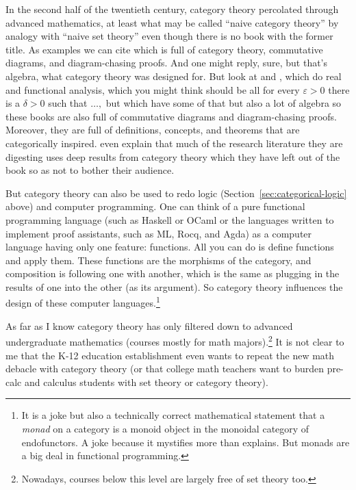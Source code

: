 \documentclass[11pt]{article}
\begin{document}
In the second half of the twentieth century, category theory percolated
through advanced mathematics, at least what may be called ``naive category
theory'' by analogy with ``naive set theory'' even though there is no book
with the former title.  As examples we can cite \citet{aluffi} which is
full of category theory, commutative diagrams, and diagram-chasing proofs.
And one might reply, sure, but that's algebra, what category theory was
designed for.  But look at \citet{lang} and \citet{beattie-butzmann}, which
do real and functional analysis, which you might think should be all
for every $\varepsilon > 0$ there is a $\delta > 0$ such that $\ldots,$
but which have some of that but also a lot of algebra so these books are
also full of commutative diagrams and diagram-chasing proofs.
Moreover, they are full of definitions, concepts, and theorems
that are categorically
inspired.  \citet[Preface]{beattie-butzmann} even explain that much of the
research literature they are digesting uses deep results from category theory
which they have left out of the book so as not to bother their audience.

But category theory can also be used to redo logic
(Section~\ref{sec:categorical-logic} above)
and computer programming.  One can think of a pure functional programming
language (such as Haskell or OCaml or the languages written to implement
proof assistants, such as ML, Rocq, and Agda) as a computer language having
only one feature: functions.  All you can do is define functions and apply
them.  These functions are the morphisms of the category, and composition
is following one with another, which is the same as plugging in the results
of one into the other (as its argument).  So category theory influences the
design of these computer languages.\footnote{It is a joke but also a
technically correct mathematical statement that a \emph{monad}
on a category is a monoid object in the monoidal category of endofunctors.
A joke because it mystifies more than explains.  But monads are a big deal
in functional programming.}

As far as I know category theory has only filtered down to advanced
undergraduate mathematics (courses mostly for math majors).\footnote{Nowadays,
courses below this level are largely free of set theory too.}  It is not
clear to me that the K-12 education establishment even wants to repeat
the new math debacle with category theory (or that college math teachers
want to burden pre-calc and calculus students with set theory or category
theory).
\end{document}
